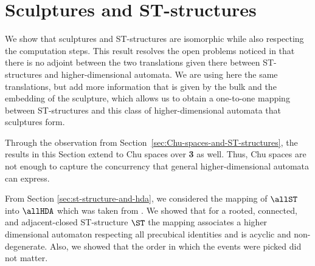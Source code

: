 \section{Sculptures and ST-structures}
    \label{sec:sculpture-and-st-structure}

    We show that sculptures and ST-structures are isomorphic while also respecting the computation steps. This result resolves the open problems noticed in \cite[Section 3.3]{Johansen16STstruct} that there is no adjoint between the two translations given there between ST-structures and higher-dimensional automata. We are using here the same translations, but add more information that is given by the bulk and the embedding of the sculpture, which allows us to obtain a one-to-one mapping between ST-structures and this class of higher-dimensional automata that sculptures form.
    
    Through the observation from Section~\ref{sec:Chu-spaces-and-ST-structures}, the results in this Section extend to Chu spaces over \textbf{3} as well. Thus, Chu spaces are not enough to capture the concurrency that general higher-dimensional automata can express.


    
    From Section \ref{sec:st-structure-and-hda}, we considered the mapping of $\allST$ into $\allHDA$ which was taken from \cite{Johansen16STstruct}. We showed that for a rooted, connected, and adjacent-closed ST-structure $\ST$ the mapping associates a higher dimensional automaton respecting all precubical identities and is acyclic and non-degenerate. Also, we showed that the order in which the events were picked did not matter.
     
